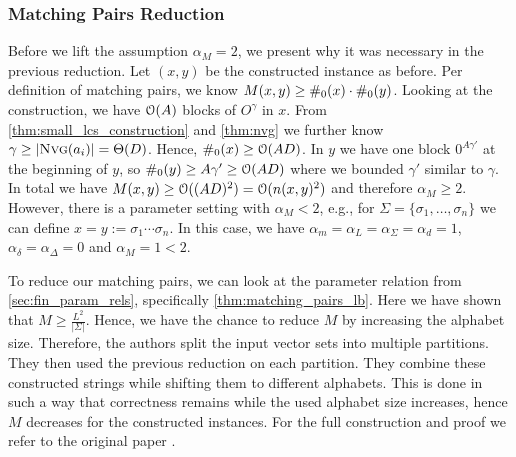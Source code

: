 \subsubsection{Matching Pairs Reduction}

Before we lift the assumption $\alpha_M = 2$, we present why it was necessary in the previous reduction.
Let $(x,y)$ be the constructed \lcs{} instance as before.
Per definition of matching pairs, we know $M(x,y) \geq \#_{0}(x) \cdot \#_{0}(y)$.
Looking at the construction, we have $\mathcal{O}(A)$ blocks of $O^\gamma$ in $x$.
From \autoref{thm:small_lcs_construction} and \ref{thm:nvg} we further know $\gamma \geq |\text{\textsc{Nvg}}(a_i)| = \Theta(D)$. 
Hence, $\#_{0}(x) \geq \mathcal{O}(AD)$.
In $y$ we have one block $0^{A\gamma'}$ at the beginning of $y$, so $\#_{0}(y) \geq A\gamma' \geq \mathcal{O}(AD)$ where we bounded $\gamma'$ similar to $\gamma$.
In total we have $M(x,y) \geq \mathcal{O}((AD)^2) = \mathcal{O}(n(x,y)^2)$ and therefore $\alpha_M \geq 2$.
However, there is a parameter setting with $\alpha_M < 2$, e.g., for $\Sigma = \{ \sigma_1, \ldots, \sigma_n \}$ we can define $x = y := \sigma_1 \cdots \sigma_n$.
In this case, we have $\alpha_m = \alpha_L = \alpha_\Sigma = \alpha_d = 1$, $\alpha_\delta = \alpha_\Delta = 0$ and $\alpha_M = 1 < 2$.


To reduce our matching pairs, we can look at the parameter relation from \autoref{sec:fin_param_rels}, specifically \autoref{thm:matching_pairs_lb}.
Here we have shown that $M \geq \frac{L^2}{|\Sigma|}$.
Hence, we have the chance to reduce $M$ by increasing the alphabet size.
Therefore, the authors split the input vector sets into multiple partitions.
They then used the previous reduction on each partition.
They combine these constructed strings while shifting them to different alphabets.
This is done in such a way that correctness remains while the used alphabet size increases, hence $M$ decreases for the constructed instances.
For the full construction and proof we refer to the original paper \cite[Section 9.1.3]{Bringman.2018}.
